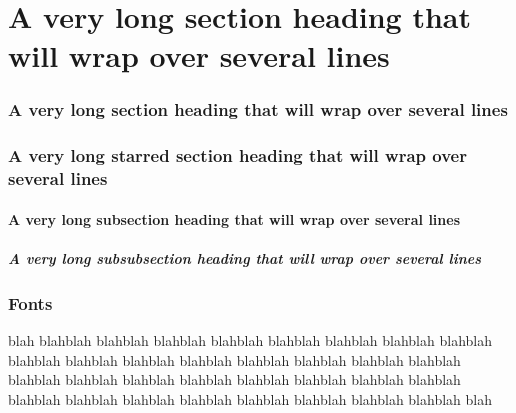 \documentclass[a4paper,serif]{module}       %
\begin{document}
%

\part{A very long section heading that will wrap over several lines}

\section{A very long section heading that will wrap over several lines}

\section*{A very long starred section heading that will wrap over several lines}

\subsection{A very long subsection heading that will wrap over several lines}

\subsubsection{A very long subsubsection heading that will wrap over several lines}

\section{Fonts}

blah blahblah blahblah blahblah blahblah blahblah blahblah blahblah blahblah blahblah blahblah blahblah blahblah blahblah blahblah blahblah blahblah blahblah blahblah blahblah blahblah blahblah blahblah blahblah blahblah blahblah blahblah blahblah blahblah blahblah blahblah blahblah blahblah blah                                 

\end{document}
